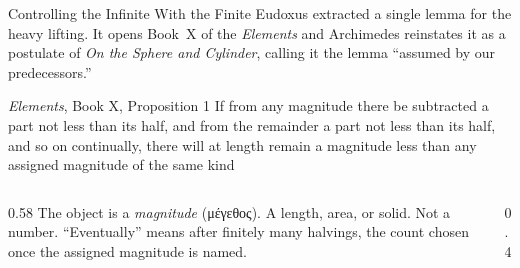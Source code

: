\documentclass[aspectratio=169]{beamer}
\begin{document}
\begin{frame}{Controlling the Infinite With the Finite}
        Eudoxus extracted a single lemma for the heavy
        lifting. It opens Book~X of the \emph{Elements} and
        Archimedes reinstates it as a postulate of \emph{On the
        Sphere and Cylinder}, calling it the lemma ``assumed by
        our predecessors.''

        \begin{block}{\emph{Elements}, Book X, Proposition 1}
                If from any magnitude there be subtracted a part not
                less than its half, and from the remainder a part not
                less than its half, and so on continually, there will
                at length remain a magnitude less than any assigned
                magnitude of the same kind
        \end{block}

        \begin{columns}
                \begin{column}{0.58\textwidth}
                        \small
                        The object is a \emph{magnitude}
                        (μέγεθος). A length, area, or solid. Not
                        a number. ``Eventually'' means after
                        finitely many halvings, the count chosen
                        once the assigned magnitude is named.
                \end{column}
                \begin{column}{0.4\textwidth}
                        \centering
                \end{column}
        \end{columns}


\end{frame}
\end{document}
